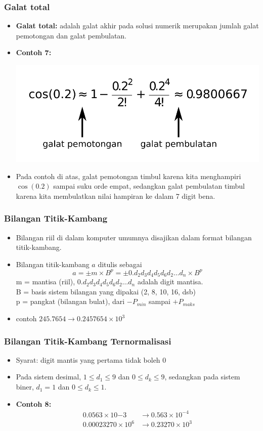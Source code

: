 \documentclass[pdflatex,compress]{beamer}
\begin{document}
\begin{frame}
	\frametitle{Galat total}
	\begin{itemize}
		\item \textbf{Galat total:} adalah galat akhir pada solusi numerik merupakan jumlah galat pemotongan dan galat pembulatan.
		\item \textbf{Contoh 7:}
		\begin{center}
			\includegraphics[width=0.6\linewidth]{img/img103.png}
		\end{center}
		\item Pada contoh di atas, galat pemotongan timbul karena kita menghampiri $ \cos(0.2) $ sampai suku orde empat, sedangkan galat pembulatan timbul karena kita membulatkan nilai hampiran ke dalam 7 digit bena.
	\end{itemize}
\end{frame}

\begin{frame}
	\frametitle{Bilangan Titik-Kambang}
	\begin{itemize}
		\item Bilangan riil di dalam komputer umumnya disajikan dalam format bilangan titik-kambang.
		\item Bilangan titik-kambang $ a $ ditulis sebagai
		\[ a = \pm m \times B^p = \pm 0.d_2 d_3 d_4 d_5 d_6 d_2 \dots d_n \times B^p \]
		m = mantisa (riil), $ 0.d_2 d_3 d_4 d_5 d_6 d_2 \dots d_n $ adalah digit mantisa.\\
		B = basis sistem bilangan yang dipakai (2, 8, 10, 16, dsb)\\
		p = pangkat (bilangan bulat), dari $ -P_{min} $ sampai $ +P_{maks} $
		\item contoh $ 245.7654 \rightarrow 0.2457654 \times 10^3 $
	\end{itemize}
\end{frame}

\begin{frame}
	\frametitle{Bilangan Titik-Kambang Ternormalisasi}
	\begin{itemize}
		\item Syarat: digit mantis yang pertama tidak boleh 0
		\item Pada sistem desimal, $ 1 \leq d_1 \leq 9 $ dan $ 0 \leq d_k \leq 9 $,
		sedangkan pada sistem biner, $ d_1 = 1 $ dan $ 0 \leq d_k \leq 1 $.
		\item \textbf{Contoh 8:} 
		\begin{align*}
			0.0563 \times 10{-3} &\rightarrow 0.563 × 10^{-4} \\
			0.00023270 × 10^6 &\rightarrow 0.23270 \times 10^3
		\end{align*}
	\end{itemize}
\end{frame}
\end{document}
